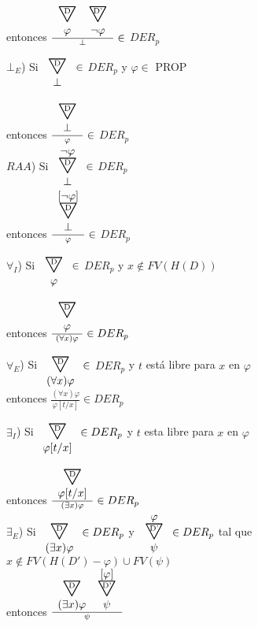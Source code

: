 \documentclass[a4paper,12pt]{article}
\newcommand\triang{\scaleobj{2}{\bigtriangledown}}
\newcommand\triangulo[3][]{\begin{array}{c} \vspace{-1.5mm} #1 \\ \ooalign{\triang\cr\hss\raisebox{0.8ex}{\scriptsize #2}\hss}\vspace{1mm} \\ #3 \end{array}
}
\begin{document}
\begin{center}
entonces $\frac{\triangulo{D}{\varphi} \triangulo{D'}{\neg\varphi}}{\bot} \in$ $DER_p$ \\
$\bot_E$) Si $\triangulo{D}{\bot} \in$ $DER_p$ y $\varphi \in$ PROP \\
entonces $\frac{\triangulo{D}{\bot}}{\varphi} \in$ $DER_p$ \\
$RAA$) Si $\triangulo[\neg\varphi]{D}{\bot} \in$ $DER_p$ \\
entonces $\frac{\triangulo[{[\neg\varphi]}]{D}{\bot}}{\varphi} \in$ $DER_p$ \\
$\forall_I$) Si $\triangulo{D}{\varphi} \in$ $DER_p$ y $ x \notin FV(H(D))$ \\
entonces $\frac{\triangulo{D}{\varphi}}{(\forall x)\varphi} \in DER_p$ \\
$\forall_E$) Si $\triangulo{D}{(\forall x)\varphi} \in$ $DER_p$ y $t$ está libre para $x$ en $\varphi$ \\
entonces $\frac{{(\forall x)\varphi}}{\varphi[t/x]} \in DER_p$ \\
$\exists_I$) Si $\triangulo{D}{\varphi[t/x]} \in DER_p$ y $t$ esta libre para $x$ en $\varphi$ \\
entonces $\frac{\triangulo{D}{\varphi[t/x]}}{(\exists x)\varphi} \in DER_p$ \\
$\exists_E$) Si $\triangulo{D}{(\exists x)\varphi} \in DER_p$ y $\triangulo[\varphi]{D'}{\psi} \in DER_p$ tal que $x \notin FV(H(D')-{\varphi}) \cup FV(\psi)$ \\
entonces $\frac{\triangulo{D}{(\exists x)\varphi}\triangulo[{[\varphi]}]{D'}{\psi}}{\psi} $
\end{center}
\end{document}
